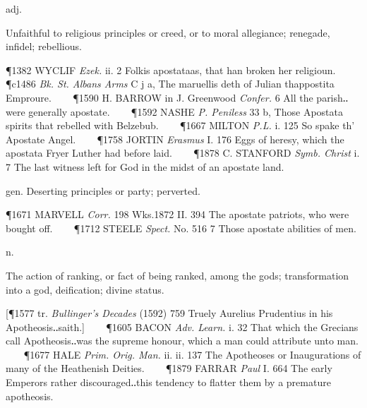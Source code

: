 \begin{description}[wide, labelwidth=!, labelindent=0pt]
\begin{myenumerate}
 adj.

 Unfaithful to religious principles or creed, or to moral allegiance; renegade, infidel; rebellious.

\P 1382 WYCLIF  \textit{Ezek.} ii. 2 Folkis apostataas, that han broken her religioun.   
\P c1486 \textit{Bk. St. Albans Arms} C j a, The maruellis deth of Julian thappostita Emproure.    
\P 1590 H. BARROW in J. Greenwood \textit{Confer.} 6 All the parish‥were generally apostate.    
\P 1592 NASHE  \textit{P. Peniless} 33 b, Those Apostata spirits that rebelled with Belzebub.    
\P 1667 MILTON  \textit{P.L.} i. 125 So spake th' Apostate Angel.    
\P 1758 JORTIN  \textit{Erasmus} I. 176 Eggs of heresy, which the apostata Fryer Luther had before laid.    
\P 1878 C. STANFORD  \textit{Symb. Christ} i. 7 The last witness left for God in the midst of an apostate land.

 gen. Deserting principles or party; perverted.

\P 1671 MARVELL  \textit{Corr.} 198 Wks.1872 II. 394 The apostate patriots, who were bought off.    
\P 1712 STEELE  \textit{Spect.} No. 516 7 Those apostate abilities of men.
\end{myenumerate}


 n.

\noindent {}

\vspace{-0.3cm}

\begin{myenumerate}

 The action of ranking, or fact of being ranked, among the gods; transformation into a god, deification; divine status.

[\P 1577 tr.  \textit{Bullinger's Decades} (1592) 759 Truely Aurelius Prudentius in his Apotheosis‥saith.]    
\P 1605 BACON  \textit{Adv. Learn.} i. 32 That which the Grecians call Apotheosis‥was the supreme honour, which a man could attribute unto man.    
\P 1677 HALE  \textit{Prim. Orig. Man.} ii. ii. 137 The Apotheoses or Inaugurations of many of the Heathenish Deities.    
\P 1879 FARRAR  \textit{Paul} I. 664 The early Emperors rather discouraged‥this tendency to flatter them by a premature apotheosis.


\end{myenumerate}
\end{description}
